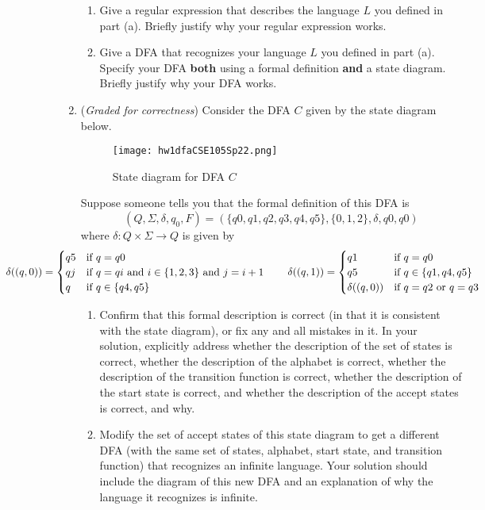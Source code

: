 \documentclass[12pt, oneside]{article}
\begin{document}
\begin{enumerate}
\begin{enumerate}
\item Give a regular expression that describes the language $L$ you defined in part (a).  
Briefly justify why your regular expression
works.
\item Give a DFA that recognizes your language $L$ you defined in part (a).  
Specify your DFA {\bf both} using a formal definition
{\bf and} a state diagram. Briefly justify why your DFA works.
\end{enumerate}

\item ({\it Graded for correctness}) Consider the DFA $C$ given by the state diagram below.
\begin{figure}[h]
   \centering
   \texttt{[image: hw1dfaCSE105Sp22.png]}
   \caption{State diagram for DFA $C$}
\end{figure}

Suppose someone tells you that the formal definition of this DFA is 
\[
(Q, \Sigma, \delta, q_0, F) =  (\{ q0, q1, q2, q3, q4, q5 \}, \{0,1,2\}, \delta, q0, q0)
\]
where $\delta: Q \times \Sigma \to Q$ is given by 
\[
\hspace{-1in}\delta ( (q, 0) ) = \begin{cases}
q5 & \text{if $q=q0$} \\
qj & \text{if $q=qi$ and $i \in \{1,2,3\}$ and $j=i+1$} \\
q & \text{if $q \in \{q4,q5\}$} \\
\end{cases}  \qquad \delta ( (q, 1) ) = \begin{cases}
    q1 & \text{if $q=q0$} \\
    q5 & \text{if $q \in \{q1,q4,q5\}$} \\
    \delta( (q,0) ) & \text{if $q=q2$ or $q=q3$} \\
    \end{cases}
\]
\begin{enumerate}
\item Confirm that this formal description is correct (in that it is consistent with the 
state diagram), or fix any and all mistakes in it.
In your solution, explicitly address whether the description of the set of states is correct, whether the 
description of the alphabet is correct, 
whether the description of the transition function is correct, 
whether the description of the start state is correct, and whether 
the description of the accept states is correct, and why.

\item Modify the set of accept states of this state diagram to get a different DFA 
(with the same set of states, alphabet, start state, and transition function) 
that recognizes an infinite language. Your solution should include the 
diagram of this new DFA and an explanation of why the language it recognizes
is infinite.
\end{enumerate}



\end{enumerate}
\end{document}
